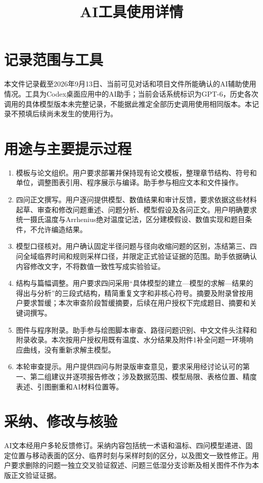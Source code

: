 \documentclass[UTF8,fontset=fandol,11pt]{ctexart}
\title{AI工具使用详情}
\author{}
\date{}
\begin{document}
\maketitle
\section{记录范围与工具}
本文件记录截至2026年9月13日、当前可见对话和项目文件所能确认的AI辅助使用情况。工具为Codex桌面应用中的AI助手；当前会话系统标识为GPT-6，历史各次调用的具体模型版本未完整记录，不能据此推定全部历史调用使用相同版本。本记录不预填后续尚未发生的使用行为。

\section{用途与主要提示过程}
\begin{enumerate}[leftmargin=*]
\item 模板与论文组织。用户要求部署并保持现有论文模板，整理章节结构、符号和单位，调整图表引用、程序展示与编译。助手参与相应文本和文件操作。
\item 四问正文撰写。用户逐问提供模型、数值结果和审计反馈，要求依据这些材料起草、审查和修改问题重述、问题分析、模型假设及各问正文。用户明确要求统一摄氏温度与Arrhenius绝对温度记法，区分建模假设、数值实现和题目条件，不允许编造结果。
\item 模型口径核对。用户确认固定半径问题与径向收缩问题的区别，冻结第三、四问全域临界时间和规则采样口径，并限定正式验证证据的范围。助手依据确认内容修改文字，不将数值一致性写成实验验证。
\item 结构与篇幅调整。用户要求四问采用“具体模型的建立—模型的求解—结果的得出与分析”的三段式结构，精简重复文字和非核心符号。摘要及附录曾按用户要求暂缓；本次审查阶段暂缓摘要，后续在用户授权下完成题目、摘要和关键词撰写。
\item 图件与程序附录。助手参与绘图脚本审查、路径问题识别、中文文件头注释和附录收录。本次按用户授权用既有温度、水分结果及附件1补全问题一环境响应曲线，没有重新求解主模型。
\item 本轮审查提示。用户提供四问与附录版审查意见，要求采用经讨论认可的第一、第二组建议并逐项报告修改；涉及数据范围、模型局限、表格位置、精度表述、引图删重和AI材料位置等。
\end{enumerate}

\section{采纳、修改与核验}
AI文本经用户多轮反馈修订。采纳内容包括统一术语和温标、四问模型递进、固定位置与移动表面的区分、临界时刻与采样时刻的区分，以及图文一致性修正。用户要求删除的问题一独立交叉验证叙述、问题三低湿分支诊断及相关图件不作为本版正文验证证据。
\end{document}
